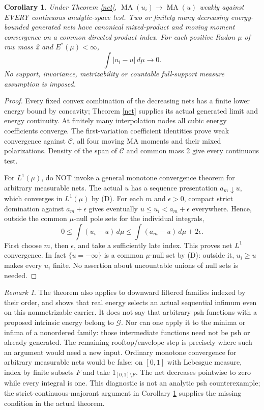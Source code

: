\documentclass[11pt]{article}
\newcommand{\MA}{\operatorname{MA}}
\newcommand{\C}{\mathcal C}
\newcommand{\G}{\mathcal G}
\newtheorem{corollary}[theorem]{Corollary}
\theoremstyle{remark}\newtheorem{remark}[theorem]{Remark}
\begin{document}
\begin{corollary}\label{netcontinuity}
Under Theorem \ref{net}, $\MA(u_i)\to\MA(u)$ weakly against
EVERY continuous analytic-space test. Two or finitely many decreasing
energy-bounded generated nets have canonical mixed-product and moving
moment convergence on a common directed product index. For each positive
Radon $\mu$ of raw mass 2 and $E^*(\mu)<\infty$,
\[
\int|u_i-u|\,d\mu\longrightarrow0.
\]
No support, invariance, metrizability or countable full-support measure
assumption is imposed.
\end{corollary}
\begin{proof}
Every fixed convex combination of the decreasing nets has a finite
lower energy bound by concavity; Theorem \ref{net} supplies its actual
generated limit and energy continuity. At finitely many interpolation
nodes all cubic energy coefficients converge. The first-variation
coefficient identities prove weak convergence against $\C$, all
four moving MA moments and their mixed polarizations. Density of the
span of $\C$ and common mass 2 give every continuous test.

For $L^1(\mu)$, do NOT invoke a general monotone convergence theorem
for arbitrary measurable nets. The actual $u$ has a sequence
presentation $a_m\downarrow u$, which converges in $L^1(\mu)$
by (D). For each $m$ and $\epsilon>0$, compact strict domination
against $a_m+\epsilon$ gives eventually
$u\le u_i<a_m+\epsilon$ everywhere. Hence, outside the common
$\mu$-null pole sets for the individual integrals,
\[
0\le\int(u_i-u)\,d\mu
\le\int(a_m-u)\,d\mu+2\epsilon.
\]
First choose $m$, then $\epsilon$, and take a sufficiently late
index. This proves net $L^1$ convergence. In fact $\{u=-\infty\}$
is a common $\mu$-null set by (D): outside it, $u_i\ge u$ makes every
$u_i$ finite. No assertion about uncountable unions of null sets is needed.
\end{proof}

\begin{remark}
The theorem also applies to downward filtered families indexed by their
order, and shows that real energy selects an actual sequential infimum
even on this nonmetrizable carrier. It does not say that arbitrary
psh functions with a proposed intrinsic energy belong to $\G$.
Nor can one apply it to the minima or infima of a nonordered family:
those intermediate functions need not be psh or already generated.
The remaining rooftop/envelope step is precisely where such an argument
would need a new input.
Ordinary monotone convergence for arbitrary measurable nets would be
false: on $[0,1]$ with Lebesgue measure, index by finite subsets $F$
and take $1_{[0,1]\setminus F}$. The net decreases pointwise to zero
while every integral is one. This diagnostic is not an analytic psh
counterexample; the strict-continuous-majorant argument in Corollary
\ref{netcontinuity} supplies the missing condition in the actual theorem.
\end{remark}
\end{document}
